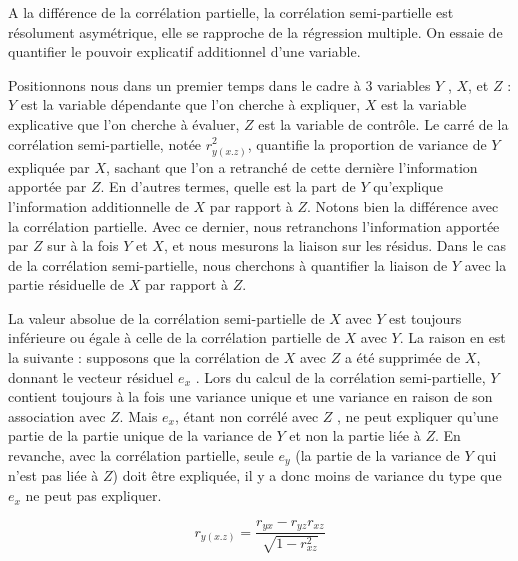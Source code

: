 \documentclass[
]{report}
\begin{document}
A la différence de la corrélation partielle, la corrélation semi-partielle est résolument asymétrique, elle se rapproche de la régression multiple. On essaie de quantifier le pouvoir explicatif additionnel d'une
variable.

Positionnons nous dans un premier temps dans le cadre à 3 variables \(Y\) , \(X\), et \(Z\) : \(Y\) est la variable dépendante que l'on cherche à expliquer, \(X\) est la variable explicative que l'on cherche à évaluer, \(Z\) est la variable de contrôle. Le carré de la corrélation semi-partielle, notée \(r^2_{y(x.z)}\), quantifie la proportion de variance de \(Y\) expliquée par \(X\), sachant que l'on a retranché de cette dernière l'information apportée par \(Z\). En d'autres termes, quelle est la part de \(Y\) qu'explique l'information additionnelle de \(X\) par rapport à \(Z\).
Notons bien la différence avec la corrélation partielle. Avec ce dernier, nous retranchons l'information apportée par \(Z\) sur à la fois \(Y\) et \(X\), et nous mesurons la liaison sur les résidus. Dans le cas de la corrélation semi-partielle, nous cherchons à quantifier la liaison de \(Y\) avec la partie résiduelle de \(X\) par rapport à \(Z\).


La valeur absolue de la corrélation semi-partielle de \(X\) avec \(Y\) est toujours inférieure ou égale à celle de la corrélation partielle de \(X\) avec \(Y\). La raison en est la suivante : supposons que la corrélation de \(X\) avec \(Z\) a été supprimée de \(X\), donnant le vecteur résiduel \(e_x\) . Lors du calcul de la corrélation semi-partielle, \(Y\) contient toujours à la fois une variance unique et une variance en raison de son association avec \(Z\). Mais \(e_x\), étant non corrélé avec \(Z\) , ne peut expliquer qu'une partie de la partie unique de la variance de \(Y\) et non la partie liée à \(Z\). En revanche, avec la corrélation partielle, seule \(e_y\) (la partie de la variance de \(Y\) qui n'est pas liée à \(Z\)) doit être expliquée, il y a donc moins de variance du type que \(e_x\) ne peut pas expliquer.

\[r_{y(x.z)}= \frac{r_{yx} - r_{yz}r_{xz}}{\sqrt{1-r^2_{xz}}}\]
\end{document}
